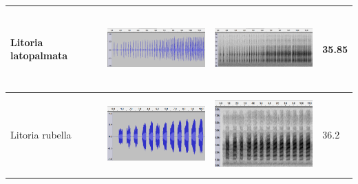 \begin{table}[htb!]
\begin{tabular}{llll}
Litoria latopalmata &      \begin{minipage}{.3\textwidth} \includegraphics[width=45mm, height=30mm]{image/Ch1/latop_wav.png}  \end{minipage}  &    \begin{minipage}{.3\textwidth} \includegraphics[width=45mm, height=30mm]{image/Ch1/latop_spec.png}    \end{minipage}     & 35.85 \\ \hline
Litoria rubella     &   \begin{minipage}{.3\textwidth} \includegraphics[width=45mm, height=30mm]{image/Ch1/rubella_wav.png}   \end{minipage}    &       \begin{minipage}{.3\textwidth} \includegraphics[width=45mm, height=30mm]{image/Ch1/rubella_spec.png}   \end{minipage}   & 36.2  \\ \hline\hline
\end{tabular}
\end{table}



